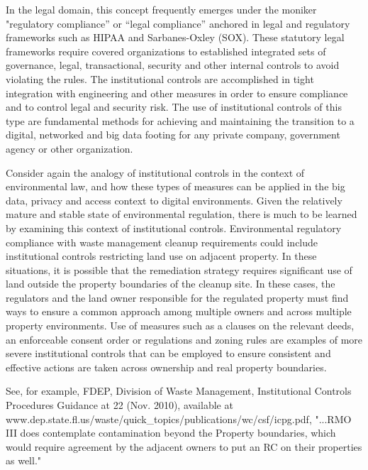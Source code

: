 In the legal domain, this concept frequently emerges under the moniker "regulatory compliance” or “legal compliance” anchored in legal and regulatory frameworks such as HIPAA and Sarbanes-Oxley (SOX).
These statutory legal frameworks require covered organizations to established integrated sets of governance, legal, transactional, security and other internal controls to avoid violating the rules.
The institutional controls are accomplished in tight integration with engineering and other measures in order to ensure compliance and to control legal and security risk.
The use of institutional controls of this type are fundamental methods for achieving and maintaining the transition to a digital, networked and big data footing for any private company, government agency or other organization.

Consider again the analogy of institutional controls in the context of environmental law, and how these types of measures can be applied in the big data, privacy and access context to digital environments.
Given the relatively mature and stable state of environmental regulation, there is much to be learned by examining this context of institutional controls.
Environmental regulatory compliance with waste management cleanup requirements could include institutional controls restricting land use on adjacent property.
In these situations, it is possible that the remediation strategy requires significant use of land outside the property boundaries of the cleanup site. 
In these cases, the regulators and the land owner responsible for the regulated property must find ways to ensure a common approach among multiple owners and across multiple property environments.
Use of measures such as a clauses on the relevant deeds, an enforceable consent order or regulations and zoning rules are examples of more severe institutional controls that can be employed to ensure consistent and effective actions are taken across ownership and real property boundaries.

See, for example, FDEP, Division of Waste Management, Institutional Controls Procedures Guidance at 22 (Nov. 2010), available at www.dep.state.fl.us/waste/quick\_topics/publications/wc/csf/icpg.pdf, "...RMO III does contemplate contamination beyond the Property boundaries, which would require agreement by the adjacent owners to put an RC on their properties as well."

